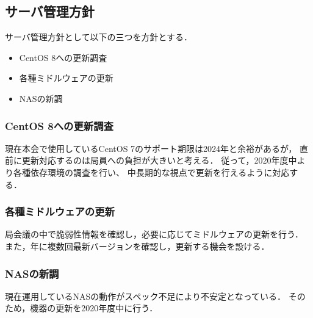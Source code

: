 \subsection*{サーバ管理方針}

サーバ管理方針として以下の三つを方針とする．
\begin{itemize}
    \item CentOS 8への更新調査
    \item 各種ミドルウェアの更新
    \item NASの新調
\end{itemize}

\subsubsection*{CentOS 8への更新調査}
現在本会で使用しているCentOS 7のサポート期限は2024年と余裕があるが，
直前に更新対応するのは局員への負担が大きいと考える．
従って，2020年度中より各種依存環境の調査を行い、
中長期的な視点で更新を行えるように対応する．

\subsubsection*{各種ミドルウェアの更新}
局会議の中で脆弱性情報を確認し，必要に応じてミドルウェアの更新を行う．
また，年に複数回最新バージョンを確認し，更新する機会を設ける．

\subsubsection*{NASの新調}
現在運用しているNASの動作がスペック不足により不安定となっている．
そのため，機器の更新を2020年度中に行う．
